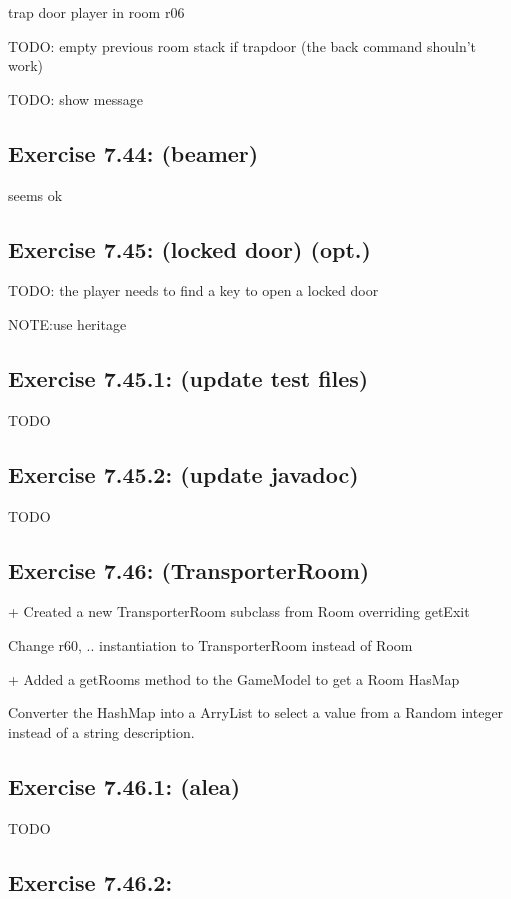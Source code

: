 \documentclass[twoside,french]{report}
\begin{document}
trap door player in room r06

TODO: empty previous room stack if trapdoor (the back command shouln't work)

TODO: show message

\subsection*{Exercise 7.44: (beamer)}

seems ok

\subsection*{Exercise 7.45: (locked door) (opt.)}

TODO: the player needs to find a key to open a locked door

NOTE:use heritage

\subsection*{Exercise 7.45.1: (update test files)}

TODO

\subsection*{Exercise 7.45.2: (update javadoc)}

TODO

\subsection*{Exercise 7.46: (TransporterRoom)}

+ Created a new TransporterRoom subclass from Room overriding getExit

Change r60, .. instantiation to TransporterRoom instead of Room

+ Added a getRooms method to the GameModel to get a Room HasMap

Converter the HashMap into a ArryList to select a value from a Random integer instead of a string description.

\subsection*{Exercise 7.46.1: (alea)}

TODO

\subsection*{Exercise 7.46.2:}
\end{document}
